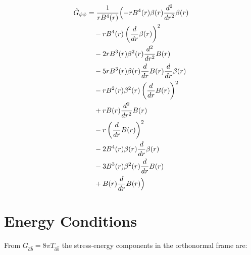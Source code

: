 \documentclass[11pt,a4paper]{article}
\begin{document}
\begin{align*}
  \hat{G}_{\hat{\varphi}\hat{\varphi}} &= \frac{1}{r B^{4}{\left(r \right)}}\Bigl(- r B^{4}{\left(r \right)} \beta{\left(r \right)} \frac{d^{2}}{d r^{2}} \beta{\left(r \right)} \\
  &\quad - r B^{4}{\left(r \right)} \left(\frac{d}{d r} \beta{\left(r \right)}\right)^{2} \\
  &\quad - 2 r B^{3}{\left(r \right)} \beta^{2}{\left(r \right)} \frac{d^{2}}{d r^{2}} B{\left(r \right)} \\
  &\quad - 5 r B^{3}{\left(r \right)} \beta{\left(r \right)} \frac{d}{d r} B{\left(r \right)} \frac{d}{d r} \beta{\left(r \right)} \\
  &\quad - r B^{2}{\left(r \right)} \beta^{2}{\left(r \right)} \left(\frac{d}{d r} B{\left(r \right)}\right)^{2} \\
  &\quad + r B{\left(r \right)} \frac{d^{2}}{d r^{2}} B{\left(r \right)} \\
  &\quad - r \left(\frac{d}{d r} B{\left(r \right)}\right)^{2} \\
  &\quad - 2 B^{4}{\left(r \right)} \beta{\left(r \right)} \frac{d}{d r} \beta{\left(r \right)} \\
  &\quad - 3 B^{3}{\left(r \right)} \beta^{2}{\left(r \right)} \frac{d}{d r} B{\left(r \right)} \\
  &\quad + B{\left(r \right)} \frac{d}{d r} B{\left(r \right)}\Bigr)
\end{align*}
\section{Energy Conditions}
From $G_{\hat{a}\hat{b}} = 8\pi T_{\hat{a}\hat{b}}$ the stress-energy components in the orthonormal frame are:
\end{document}
